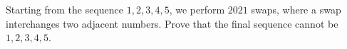 Starting from the sequence $1,2,3,4,5$, we perform $2021$ swaps, where a swap interchanges two adjacent numbers. Prove that the final sequence cannot be $1,2,3,4,5$.
